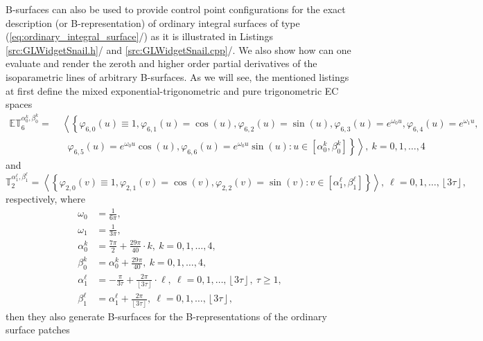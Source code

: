 \documentclass[b5paper, twosided]{book}
\DeclareRobustCommand{\mref}[1]{\ref{#1}{\relsize{-1}/\pageref{#1}}}
\begin{document}
B-surfaces can also be used to provide control point configurations for the exact description (or B-representation) of ordinary integral surfaces of type (\mref{eq:ordinary_integral_surface}) as it is illustrated in Listings \mref{src:GLWidgetSnail.h} and \mref{src:GLWidgetSnail.cpp}. We also show how can one evaluate and render the zeroth and higher order partial derivatives of the isoparametric lines of arbitrary B-surfaces. As we will see, the mentioned listings at first define the mixed exponential-trigonometric and pure trigonometric EC spaces
\begin{align*}
\mathbb{ET}_6^{\alpha_0^k,\beta_0^k}
=&~
\left\langle
\left\{
\varphi_{6,0}\left(u\right) \equiv 1,
\varphi_{6,1}\left(u\right)=\cos\left(u\right),
\varphi_{6,2}\left(u\right)=\sin\left(u\right),
\varphi_{6,3}\left(u\right)=e^{\omega_0 u},
\varphi_{6,4}\left(u\right)=e^{\omega_1 u},
\right.
\right.
\\
&~~~\,
\left.
\left.
\varphi_{6,5}\left(u\right)=e^{\omega_0 u} \cos\left(u\right),
\varphi_{6,6}\left(u\right)=e^{\omega_0 u} \sin\left(u\right):
u \in \left[\alpha_0^k,\beta_0^k\right]
\right\}
\right\rangle,~k=0,1,\ldots,4
\end{align*}
and
\[
\mathbb{T}_2^{\alpha_1^{\ell}, \beta_1^{\ell}} =
\left\langle
\left\{
\varphi_{2,0}\left(v\right) \equiv 1, 
\varphi_{2,1}\left(v\right)=\cos\left(v\right),
\varphi_{2,2}\left(v\right)=\sin\left(v\right) :
v \in \left[\alpha_1^{\ell}, \beta_1^{\ell}\right]
\right\}
\right\rangle,~\ell = 0,1,\ldots,\left\lfloor 3\tau \right\rfloor,
\]
respectively, where 
\begin{align*}
\omega_0 &= \frac{1}{6\pi},\\
\omega_1 &= \frac{1}{3\pi},\\
\alpha_0^k &= \frac{7\pi}{2}+\frac{29\pi}{40}\cdot k,~k=0,1,\ldots,4,\\
\beta_0^k  &= \alpha_0^k + \frac{29\pi}{40},~k=0,1,\ldots,4,\\
\alpha_1^{\ell} &= -\frac{\pi}{3\tau}+\frac{2\pi}{\left\lfloor 3\tau\right\rfloor}\cdot\ell,~\ell=0,1,\ldots,\left\lfloor 3\tau\right\rfloor,~\tau \geq 1,\\
\beta_1^{\ell}  &= \alpha_1^{\ell} + \frac{2\pi}{\left\lfloor 3\tau\right \rfloor},~\ell=0,1,\ldots,\left\lfloor 3\tau\right\rfloor,
\end{align*}
then they also generate B-surfaces for the B-representations of the ordinary surface patches 
\end{document}
